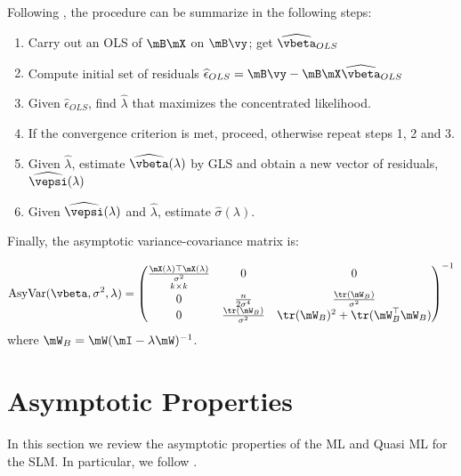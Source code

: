 \documentclass[english,12pt]{book}\usepackage[]{graphicx}\usepackage[]{xcolor}
\begin{document}
\begin{algorithm}

Following \cite{anselin1988spatial}, the procedure can be summarize in the following steps:

\begin{enumerate}
		\item Carry out an OLS of $\mB\mX$ on $\mB\vy$; get $\widehat{\vbeta}_{OLS}$
		\item Compute initial set of residuals $\widehat{\epsilon}_{OLS} = \mB\vy - \mB\mX\widehat{\vbeta}_{OLS}$
		\item Given $\widehat{\epsilon}_{OLS} $, find $\widehat{\lambda}$ that maximizes the concentrated likelihood.
		\item If the convergence criterion is met, proceed, otherwise repeat steps 1, 2 and 3.
		\item Given $\widehat{\lambda}$, estimate $\widehat{\vbeta}(\lambda)$ by GLS and obtain a new vector of residuals, $\widehat{\vepsi}(\lambda)$
		\item Given  $\widehat{\vepsi}(\lambda)$ and $\widehat{\lambda}$, estimate $\widehat{\sigma}(\lambda)$.
\end{enumerate}	
\end{algorithm}


Finally, the asymptotic variance-covariance matrix is:

\begin{equation}\label{eq:asyvar_sem}
\mbox{AsyVar}(\vbeta, \sigma^2, \lambda)  = 
\begin{pmatrix}
 \underset{k \times k}{\frac{\mX(\lambda)\top\mX(\lambda)}{\sigma^2}} & 0 & 0 \\
  0 & \frac{n}{2\sigma^4} & \frac{\tr(\mW_B)}{\sigma^2} \\
 0 & \frac{\tr(\mW_B)}{\sigma^2} & \tr(\mW_B)^2 + \tr(\mW_B^\top\mW_B)
\end{pmatrix}^{-1}
\end{equation}
%
where $\mW_B = \mW(\mI - \lambda\mW)^{-1}$.

\section{Asymptotic Properties}


In this section we review the asymptotic properties of the ML and Quasi ML for the SLM. In particular, we follow \cite{lee2004asymptotic}.
\end{document}

